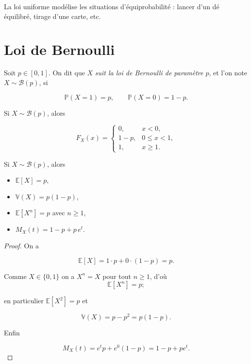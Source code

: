 \begin{remarque}
La loi uniforme modélise les situations d'équiprobabilité : lancer d'un dé équilibré, tirage d'une carte, etc.
\end{remarque}

\section{Loi de Bernoulli}

\medskip

\begin{mdframed}
\begin{definition}
Soit $p\in[0,1]$. On dit que $X$ \emph{suit la loi de Bernoulli de paramètre $p$}, et l'on note $X\sim \mathcal{B}(p)$, si

$$
\mathbb{P}(X=1)=p,\qquad \mathbb{P}(X=0)=1-p.
$$
\end{definition}
\end{mdframed}

\medskip

\begin{mdframed}
\begin{proposition}
Si $X\sim \mathcal{B}(p)$, alors

$$
  F_X(x)=
  \begin{cases}
    0, & x<0,\\
    1-p, & 0\le x<1,\\
    1, & x\ge 1.
  \end{cases}
$$
\end{proposition}
\end{mdframed}

\medskip

\begin{mdframed}
\begin{proposition}
Si $X\sim \mathcal{B}(p)$, alors

\begin{itemize}
\item $\mathbb{E}[X]=p$,
\item $\mathbb{V}(X)=p(1-p)$,
\item $\mathbb{E}[X^n]=p$ avec $n\ge1$,
\item $M_X(t)=1-p+p\,e^{t}$.
\end{itemize}
\end{proposition}
\end{mdframed}

\begin{proof}
On a

$$
\mathbb{E}[X]=1\cdot p+0\cdot(1-p)=p. 
$$

Comme $X\in\{0,1\}$ on a $X^n=X$ pour tout $n\ge1$, d'où 
$$
\mathbb{E}[X^n]=p;
$$ 

en particulier $\mathbb{E}[X^2]=p$ et

$$
\mathbb{V}(X)=p-p^2=p(1-p).
$$

Enfin 

$$
M_X(t)=e^{t}p+e^{0}(1-p)=1-p+pe^t.
$$
\end{proof}

